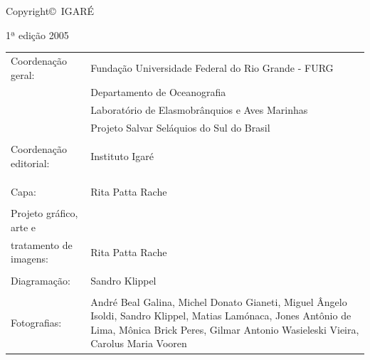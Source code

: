 \documentclass[a4paper,11pt,twoside,showtrims,onecolumn,openright,final]{memoir}
\begin{document}
\newpage


% 

\begin{scriptsize}

\begin{flushleft}


\vspace{0.2cm}

Copyright\copyright~IGARÉ

\vspace*{\baselineskip}

1ª edição 2005

\vspace*{\baselineskip}
% 
\begin{tabularx}{\textwidth}{lX}
Coordenação geral:	& Fundação Universidade Federal do Rio Grande - FURG \\
			& Departamento de Oceanografia \\
			& Laboratório de Elasmobrânquios e Aves Marinhas \\
			& Projeto Salvar Seláquios do Sul do Brasil \\
			&	\\
Coordenação editorial:	& Instituto Igaré \\
			&	\\
			&	\\
			&	\\
\hspace*{1cm} Capa:	& Rita Patta Rache \\
			&	\\
\hspace*{1cm} Projeto gráfico, arte e & \\
\hspace*{1cm} tratamento de imagens:  & Rita Patta Rache \\
			&	\\
\hspace*{1cm} Diagramação: & Sandro Klippel \\
			&	\\
\hspace*{1cm} Fotografias: & André Beal Galina, Michel Donato Gianeti,
			    Miguel Ângelo Isoldi, Sandro Klippel,
			    Matias Lamónaca, Jones Antônio de Lima,
			    Mônica Brick Peres, Gilmar Antonio Wasieleski Vieira,
			    Carolus Maria Vooren \\

\end{tabularx}


\end{flushleft}
\end{scriptsize}
\end{document}
